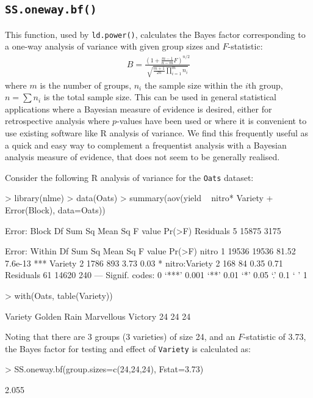 \documentclass[a4paper,10pt]{amsart}
\begin{document}
\subsection{\texttt{SS.oneway.bf()}} 
This function, used by \texttt{ld.power()}, calculates the
\cite{SpiegelhalterSmith82} Bayes factor corresponding to a one-way
analysis of variance with given group sizes and $F$-statistic:
\begin{gather}
B = \frac{\left(1 + \frac{m-1}{n-m} F\right)^{n/2}}{\sqrt{\frac{m+1}{2n} \prod_{i=1}^m n_i}}
\end{gather}
where $m$ is the number of groups, $n_i$ the sample size within the
$i$th group, $n = \sum n_i$ is the total sample size.  This can be
used in general statistical applications where a Bayesian measure of
evidence is desired, either for retrospective analysis where
$p$-values have been used or where it is convenient to use existing
software like R analysis of variance. We find this frequently useful
as a quick and  easy way to complement a frequentist analysis with a 
Bayesian analysis measure of evidence, that does not seem to be generally realised.

Consider the following R analysis of variance for the \texttt{Oats} dataset:
\begin{Schunk}
\begin{Sinput}
> library(nlme)
> data(Oats)
> summary(aov(yield ~ nitro* Variety + Error(Block), data=Oats))
\end{Sinput}
\begin{Soutput}
Error: Block
          Df Sum Sq Mean Sq F value Pr(>F)
Residuals  5  15875    3175               

Error: Within
              Df Sum Sq Mean Sq F value  Pr(>F)    
nitro          1  19536   19536   81.52 7.6e-13 ***
Variety        2   1786     893    3.73    0.03 *  
nitro:Variety  2    168      84    0.35    0.71    
Residuals     61  14620     240                    
---
Signif. codes:  0 ‘***’ 0.001 ‘**’ 0.01 ‘*’ 0.05 ‘.’ 0.1 ‘ ’ 1 
\end{Soutput}
\begin{Sinput}
> with(Oats, table(Variety))
\end{Sinput}
\begin{Soutput}
Variety
Golden Rain  Marvellous     Victory 
         24          24          24 
\end{Soutput}
\end{Schunk}
Noting that there are 3 groups (3 varieties) of size 24, and an
$F$-statistic of 3.73, the \cite{SpiegelhalterSmith82} Bayes factor
for testing and effect of \texttt{Variety} is calculated as:
\begin{Schunk}
\begin{Sinput}
> SS.oneway.bf(group.sizes=c(24,24,24), Fstat=3.73)
\end{Sinput}
\begin{Soutput}
[1] 2.055
\end{Soutput}
\end{Schunk}
\end{document}
